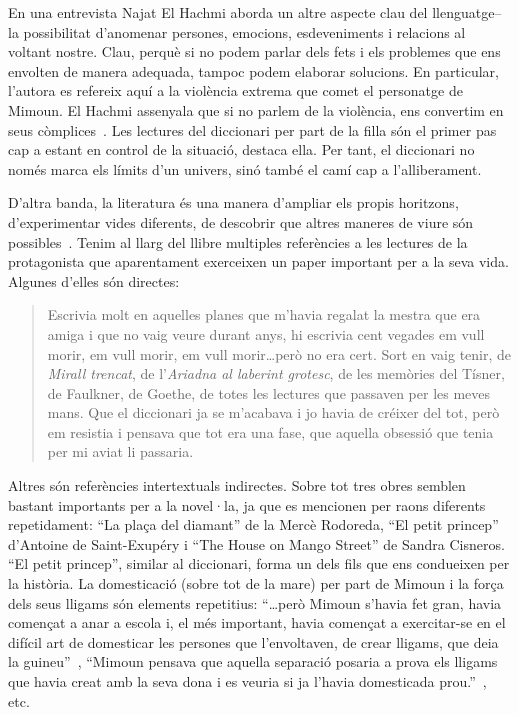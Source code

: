 En una entrevista Najat El Hachmi aborda un altre aspecte clau del llenguatge--la possibilitat d'anomenar persones, emocions, esdeveniments i relacions al voltant nostre.
Clau, perquè si no podem parlar dels fets i els problemes que ens envolten de manera adequada, tampoc podem elaborar solucions.
En particular, l'autora es refereix aquí a la violència extrema que comet el personatge de Mimoun.
El Hachmi assenyala que si no parlem de la violència, ens convertim en seus còmplices~\autocite{HaAM2011}.
Les lectures del diccionari per part de la filla són el primer pas cap a estant en control de la situació, destaca ella.
Per tant, el diccionari no només marca els límits d'un univers, sinó també el camí cap a l'alliberament.

D'altra banda, la literatura és una manera d'ampliar els propis horitzons, d'experimentar vides diferents, de descobrir que altres maneres de viure són possibles~\autocite{HaAM2011}.
Tenim al llarg del llibre multiples referències a les lectures de la protagonista que aparentament exerceixen un paper important per a la seva vida.
Algunes d'elles són directes:
\begin{quote}
  Escrivia molt en aquelles planes que m'havia regalat la mestra que era amiga i que no vaig veure durant anys, hi escrivia cent vegades em vull morir, em vull morir, em vull morir\ldots però no era cert. Sort en vaig tenir, de \textit{Mirall trencat}, de l'\textit{Ariadna al laberint grotesc}, de les memòries del Tísner, de Faulkner, de Goethe, de totes les lectures que passaven per les meves mans. Que el diccionari ja se m'acabava i jo havia de créixer del tot, però em resistia i pensava que tot era una fase, que aquella obsessió que tenia per mi aviat li passaria.~\autocite[286]{ElHachmi2008}
\end{quote}

Altres són referències intertextuals indirectes.
Sobre tot tres obres semblen bastant importants per a la novel·la, ja que es mencionen per raons diferents repetidament: ``La plaça del diamant'' de la Mercè Rodoreda, ``El petit princep'' d'Antoine de Saint-Exupéry i ``The House on Mango Street'' de Sandra Cisneros.
``El petit princep'', similar al diccionari, forma un dels fils que ens condueixen per la història.
La domesticació (sobre tot de la mare) per part de Mimoun i la força dels seus lligams són elements repetitius:
``\ldots però Mimoun s'havia fet gran, havia començat a anar a escola i, el més important, havia començat a exercitar-se en el difícil art de domesticar les persones que l'envoltaven, de crear lligams, que deia la guineu''~\autocite[24]{ElHachmi2008},
``Mimoun pensava que aquella separació posaria a prova els lligams que havia creat amb la seva dona i es veuria si ja l'havia domesticada prou.''~\autocite[124]{ElHachmi2008}, etc.


